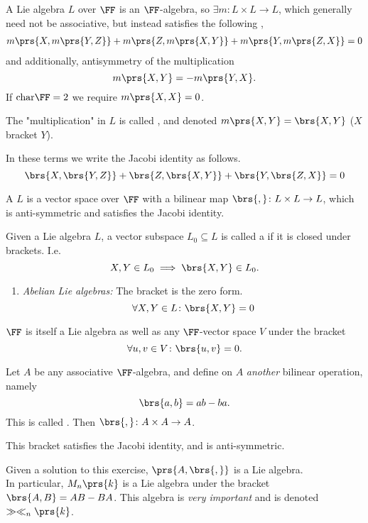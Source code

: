 \documentclass[10pt,a4paper,twoside,openany,hidelinks]{book}
\begin{document}
\begin{definition}
A Lie algebra $L$ over $\FF$ is an $\FF$-algebra, so $\exists m \colon L \times L \to L$, which generally need not be associative, but instead satisfies the following ,
\begin{align*}
m\prs{X, m\prs{Y,Z}} + m\prs{Z, m\prs{X,Y}} + m\prs{Y,m\prs{Z,X}} = 0
\end{align*}
and additionally, antisymmetry of the multiplication
\[m\prs{X,Y} = -m\prs{Y,X} \text{.}\]
If $\mathrm{char}\FF = 2$ we require $m\prs{X,X} = 0$.
\end{definition}
\begin{notation}
The "multiplication" in $L$ is called , and denoted $m\prs{X,Y} = \brs{X,Y}$ ($X$ bracket $Y$).
\end{notation}
\begin{remark}
In these terms we write the Jacobi identity as follows.
\[\brs{X,\brs{Y,Z}} + \brs{Z,\brs{X,Y}} + \brs{Y,\brs{Z,X}} = 0\] 
\end{remark}
\begin{definition}
A  $L$ is a vector space over $\FF$ with a bilinear map $\brs{,} \colon L \times L \to L$, which is anti-symmetric and satisfies the Jacobi identity.
\end{definition}
\begin{definition}
Given a Lie algebra $L$, a vector subspace $L_0 \subseteq L$ is called a  if it is closed under brackets. I.e.
\[X,Y \in L_0 \implies \brs{X,Y} \in L_0 \text{.}\]
\end{definition}
\begin{examples}
\begin{enumerate}
\item \emph{Abelian Lie algebras:} The bracket is the zero form.
\[\forall X,Y \in L\colon \brs{X,Y} = 0\]
\end{enumerate}
\end{examples}
\begin{example}
$\FF$ is itself a Lie algebra as well as any $\FF$-vector space $V$ under the bracket \[\forall u,v \in V\colon \brs{u,v} = 0\text{.}\]
\end{example}
\begin{example}
Let $A$ be any associative $\FF$-algebra, and define on $A$ \emph{another} bilinear operation, namely
\[\brs{a,b} = ab - ba \text{.}\]
This is called .
Then $\brs{,} \colon A \times A \to A$.
\begin{exercise}
This bracket satisfies the Jacobi identity, and is anti-symmetric.
\end{exercise}
Given a solution to this exercise, $\prs{A, \brs{,}}$ is a Lie algebra.
\\
In particular, $M_n\prs{k}$ is a Lie algebra under the bracket $\brs{A,B} = AB - BA$.
This algebra is \emph{very important} and is denoted $\gg \ll_n \prs{k}$.
\end{example}
\end{document}
